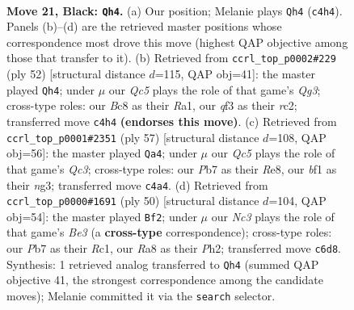 \documentclass[11pt]{article}
\begin{document}
\clearpage

\begin{figure}[p]\centering
\begin{subfigure}{0.46\textwidth}\centering
\resizebox{\linewidth}{!}{%
\newchessgame
\chessboard[
  setfen={r1b1k3/pp6/2n3p1/4b1P1/2q5/3p1Q2/3B2K1/1R3BN1 b q - 5 21},
  showmover=false,
  pgfstyle=straightmove, color=movearrow, markmove={c4-h4}
]}
\caption{}
\end{subfigure}\hfill
\begin{subfigure}{0.46\textwidth}\centering
\resizebox{\linewidth}{!}{%
\newchessgame
\chessboard[
  setfen={5rk1/1R1b2p1/p1n1p1P1/q5B1/P7/2P3Q1/2r3P1/R5K1 w - - 1 27},
  showmover=false,
  pgfstyle=straightmove, color=movearrow, markmove={g3-h4}
]}
\caption{}
\end{subfigure}
\\[4pt]
\begin{subfigure}{0.46\textwidth}\centering
\resizebox{\linewidth}{!}{%
\newchessgame
\chessboard[
  setfen={3kr3/3n3Q/2q2p2/2b5/3pp3/6N1/5PPP/2BR2K1 b - - 3 29},
  showmover=false,
  pgfstyle=straightmove, color=movearrow, markmove={c6-a4}
]}
\caption{}
\end{subfigure}\hfill
\begin{subfigure}{0.46\textwidth}\centering
\resizebox{\linewidth}{!}{%
\newchessgame
\chessboard[
  setfen={r5k1/1b2qppp/3b4/3P4/5P2/3QBBP1/7P/2R3K1 w - - 1 26},
  showmover=false,
  pgfstyle=straightmove, color=movearrow, markmove={e3-f2}
]}
\caption{}
\end{subfigure}
\caption{\textbf{Move 21, Black: \texttt{Qh4}.} (a) Our position; Melanie plays \texttt{Qh4} (\texttt{c4h4}). Panels (b)--(d) are the retrieved master positions whose correspondence most drove this move (highest QAP objective among those that transfer to it). (b) Retrieved from \texttt{ccrl\_top\_p0002\#229} (ply 52) [structural distance $d$=115, QAP obj=41]: the master played \texttt{Qh4}; under $\mu$ our \emph{Qc5} plays the role of that game's \emph{Qg3}; cross-type roles: our \emph{B}c8 as their \emph{R}a1, our \emph{q}f3 as their \emph{r}c2; transferred move \texttt{c4h4} \textbf{(endorses this move)}. (c) Retrieved from \texttt{ccrl\_top\_p0001\#2351} (ply 57) [structural distance $d$=108, QAP obj=56]: the master played \texttt{Qa4}; under $\mu$ our \emph{Qc5} plays the role of that game's \emph{Qc3}; cross-type roles: our \emph{P}b7 as their \emph{R}e8, our \emph{b}f1 as their \emph{n}g3; transferred move \texttt{c4a4}. (d) Retrieved from \texttt{ccrl\_top\_p0000\#1691} (ply 50) [structural distance $d$=104, QAP obj=54]: the master played \texttt{Bf2}; under $\mu$ our \emph{Nc3} plays the role of that game's \emph{Be3} (a \textbf{cross-type} correspondence); cross-type roles: our \emph{P}b7 as their \emph{R}c1, our \emph{R}a8 as their \emph{P}h2; transferred move \texttt{c6d8}. Synthesis: 1 retrieved analog transferred to \texttt{Qh4} (summed QAP objective 41, the strongest correspondence among the candidate moves); Melanie committed it via the \texttt{search} selector.}
\label{fig:thought-m41}
\end{figure}
\end{document}
